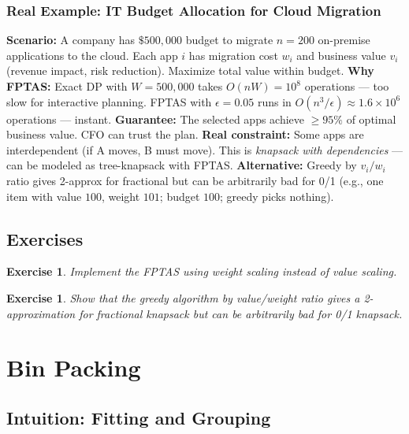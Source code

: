 \documentclass[11pt,oneside]{book}
\newtheorem{exercise}[theorem]{Exercise}
\begin{document}
\subsection*{Real Example: IT Budget Allocation for Cloud Migration}
\textbf{Scenario:} A company has $\$500,000$ budget to migrate $n=200$ on-premise applications to the cloud. Each app $i$ has migration cost $w_i$ and business value $v_i$ (revenue impact, risk reduction). Maximize total value within budget.
\textbf{Why FPTAS:} Exact DP with $W=500,000$ takes $O(nW) = 10^8$ operations — too slow for interactive planning. FPTAS with $\epsilon=0.05$ runs in $O(n^3/\epsilon) \approx 1.6 \times 10^6$ operations — instant.
\textbf{Guarantee:} The selected apps achieve $\geq 95\%$ of optimal business value. CFO can trust the plan.
\textbf{Real constraint:} Some apps are interdependent (if A moves, B must move). This is \emph{knapsack with dependencies} — can be modeled as tree-knapsack with FPTAS.
\textbf{Alternative:} Greedy by $v_i/w_i$ ratio gives 2-approx for fractional but can be arbitrarily bad for 0/1 (e.g., one item with value $100$, weight $101$; budget $100$; greedy picks nothing).

\section{Exercises}
\begin{exercise}
Implement the FPTAS using weight scaling instead of value scaling.
\end{exercise}
\begin{exercise}
Show that the greedy algorithm by value/weight ratio gives a 2-approximation for fractional knapsack but can be arbitrarily bad for 0/1 knapsack.
\end{exercise}

\chapter{Bin Packing}
\label{ch:bin_packing}

\section{Intuition: Fitting and Grouping}
\end{document}
